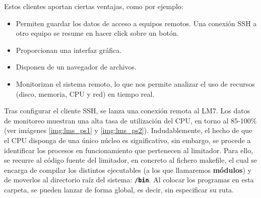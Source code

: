 Estos clientes aportan ciertas ventajas, como por ejemplo:

\begin{itemize}
    \item Permiten guardar los datos de acceso a equipos remotos. Una conexión \acrshort{SSH} a otro equipo se resume en hacer click sobre un botón.
    \item Proporcionan una interfaz gráfica.
    \item Disponen de un navegador de archivos.
    \item Monitorizan el sistema remoto, lo que nos permite analizar el uso de recursos (disco, memoria, \acrshort{CPU} y red) en tiempo real.
\end{itemize}

Tras configurar el cliente \acrshort{SSH}, se lanza una conexión remota al \gls{LM7}. Los datos de monitoreo muestran una alta tasa de utilización del \acrshort{CPU}, en torno al 85-100\% (ver imágenes \ref{img:lms_ps1} y \ref{img:lms_ps2}). Indudablemente, el hecho de que el \acrshort{CPU} disponga de una único núcleo es significativo, sin embargo, se procede a identificar los procesos en funcionamiento que pertenecen al limitador. Para ello, se recurre al código fuente del limitador, en concreto al fichero \gls{makefile}, el cual se encarga de compilar los distintos ejecutables (a los que llamaremos \textbf{módulos}) y de moverlos al directorio raíz del sistema: \textbf{\texttt{/bin}}. Al colocar los programas en esta carpeta, se pueden lanzar de forma global, es decir, sin especificar su ruta.

